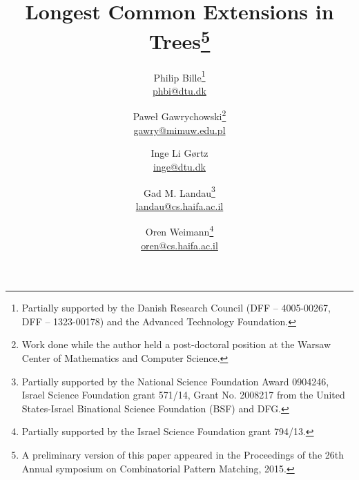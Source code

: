 \documentclass [10pt]{article}
\begin{document}
\title{Longest Common Extensions in Trees\footnote{A preliminary version of this paper appeared in the Proceedings of the 26th Annual symposium on Combinatorial Pattern Matching, 2015.}}
\author{Philip Bille\thanks{Partially supported by the Danish Research Council (DFF – 4005-00267, DFF – 1323-00178) and the Advanced Technology Foundation.} \\  \href{mailto:phbi@dtu.dk}{phbi@dtu.dk} \and Pawe{\l} Gawrychowski\thanks{Work done while the author held a post-doctoral position
at the Warsaw Center of Mathematics and Computer Science.}\\ \href{mailto:gawry@mimuw.edu.pl}{gawry@mimuw.edu.pl} \and Inge Li G{\o}rtz\\
 \href{mailto:inge@dtu.dk}{inge@dtu.dk}    \and  
 Gad M. Landau\thanks{Partially supported by the National Science Foundation
Award 0904246, Israel Science Foundation grant  571/14,
Grant No. 2008217 from the United States-Israel
Binational Science Foundation (BSF) and DFG.} \\  \href{mailto:landau@cs.haifa.ac.il}{landau@cs.haifa.ac.il}   
\and Oren Weimann\thanks{Partially supported by  the Israel Science Foundation grant 794/13.} \\  \href{mailto:oren@cs.haifa.ac.il}{oren@cs.haifa.ac.il} }
\date{}

\maketitle
\end{document}
